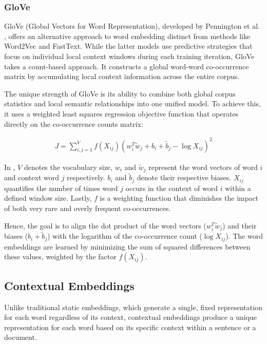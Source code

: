\subsubsection*{GloVe}

GloVe (Global Vectors for Word Representation), developed by Pennington et al. \cite{PenningtonGloveGlobal2014}, offers an alternative approach to word embedding distinct from methods like Word2Vec and FastText. While the latter models use predictive strategies that focus on individual local context windows during each training iteration, GloVe takes a count-based approach. It constructs a global word-word co-occurrence matrix by accumulating local context information across the entire corpus.

The unique strength of GloVe is its ability to combine both global corpus statistics and local semantic relationships into one unified model. To achieve this, it uses a weighted least squares regression objective function that operates directly on the co-occurrence counts matrix:

\begin{align}
    J = \sum_{i,j=1}^{V} f(X_{ij})(w_i^T \tilde{w}_j + b_i + \tilde{b}_j - \log X_{ij})^2 \label{eq:glove-objective-function}
\end{align}

In , $V$ denotes the vocabulary size, $w_i$ and $\tilde{w}_j$ represent the word vectors of word $i$ and context word $j$ respectively. $b_i$ and $\tilde{b}_j$ denote their respective biases. $X_{ij}$ quantifies the number of times word $j$ occurs in the context of word $i$ within a defined window size. Lastly, $f$ is a weighting function that diminishes the impact of both very rare and overly frequent co-occurrences.

Hence, the goal is to align the dot product of the word vectors ($w_i^T \tilde{w}_j$) and their biases ($b_i + \tilde{b}_j$) with the logarithm of the co-occurrence count ($\log X_{ij}$).
The word embeddings are learned by minimizing the sum of squared differences between these values, weighted by the factor $f(X_{ij})$.


\subsection{Contextual Embeddings} \label{sec:contextual-embeddings}

Unlike traditional static embeddings, which generate a single, fixed representation for each word regardless of its context, contextual embeddings produce a unique representation for each word based on its specific context within a sentence or a document.


